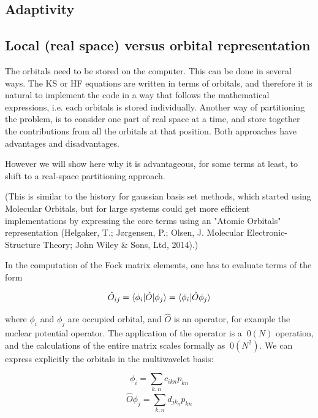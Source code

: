 \documentclass{article}
\begin{document}
\subsection{Adaptivity}



\subsection{Local (real space) versus orbital representation}

The orbitals need to be stored on the computer. This can be done in several ways. The KS or HF equations are written in terms of orbitals, and therefore it is natural to implement the code in a way that follows the mathematical expressions, i.e. each orbitals is stored individually. Another way of partitioning the problem, is to consider one part of real space at a time, and store together the contributions from all the orbitals at that position. Both approaches have advantages and disadvantages.

However we will show here why it is advantageous, for some terms at least, to shift to a real-space partitioning approach.

(This is similar to the history for gaussian basis set methods, which started using Molecular Orbitals, but for large systems could get more efficient implementations by expressing the core terms using an "Atomic Orbitals" representation (Helgaker, T.; Jørgensen, P.; Olsen, J. Molecular Electronic-Structure Theory; John Wiley \& Sons, Ltd, 2014).)

In the computation of the Fock matrix elements, one has to evaluate terms of the form 

\begin{equation}
  {\hat O}_{ij} = \braket{\phi_i | {\hat O} |\phi_j}  = \braket{\phi_i | {\hat O} \phi_j} 
\end{equation}

where $\phi_i$ and $\phi_j$ are occupied orbital, and ${\hat O}$ is an operator, for example the nuclear potential operator. The application of the operator is a $~0(N)$ operation, and the calculations of the entire matrix scales formally as $~0(N^2)$. We can express explicitly the orbitals in the multiwavelet basis:

\begin{equation}
  \phi_i = \sum_{k,n} c_{ikn} p_{kn} 
\end{equation}
\begin{equation}
  {\hat O} \phi_j = \sum_{k,n} d_{jk_n} p_{kn} 
\end{equation}
\end{document}
